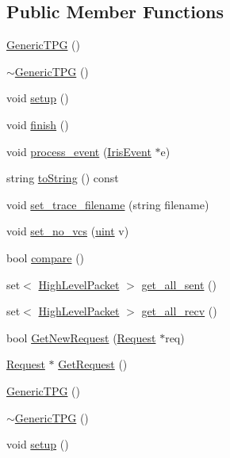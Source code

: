 \subsection*{Public Member Functions}
\begin{CompactItemize}
\item 
\hyperlink{classGenericTPG_4caf5cdc5c95a600391ecd2eb2c071fc}{GenericTPG} ()
\item 
\hyperlink{classGenericTPG_f1c645245af41d6b21eef232ff65587a}{$\sim$GenericTPG} ()
\item 
void \hyperlink{classGenericTPG_5cea355b4db26ed22a7af8e54758de47}{setup} ()
\item 
void \hyperlink{classGenericTPG_8dd8fa2cd2721789a63084d8fe912366}{finish} ()
\item 
void \hyperlink{classGenericTPG_a2e59f102384206268808835bcb9d5b5}{process\_\-event} (\hyperlink{classIrisEvent}{IrisEvent} $\ast$e)
\item 
string \hyperlink{classGenericTPG_c2e1dc7b0de824c846f37c4a1c282303}{toString} () const 
\item 
void \hyperlink{classGenericTPG_fe1f30bce868ee2caa01d3f7a2229945}{set\_\-trace\_\-filename} (string filename)
\item 
void \hyperlink{classGenericTPG_e95391a655cacb75ba23e7eb8b3cefef}{set\_\-no\_\-vcs} (\hyperlink{outputBuffer_8h_91ad9478d81a7aaf2593e8d9c3d06a14}{uint} v)
\item 
bool \hyperlink{classGenericTPG_d26b3d9a264ebe07d44b9194626c98d7}{compare} ()
\item 
set$<$ \hyperlink{classHighLevelPacket}{HighLevelPacket} $>$ \hyperlink{classGenericTPG_2b424dd4b2f5aa07a0231d69d5790470}{get\_\-all\_\-sent} ()
\item 
set$<$ \hyperlink{classHighLevelPacket}{HighLevelPacket} $>$ \hyperlink{classGenericTPG_aca7529b0e19d664ee40392b7761e338}{get\_\-all\_\-recv} ()
\item 
bool \hyperlink{classGenericTPG_e0d0461b59107eb3b4facb4d29ada948}{GetNewRequest} (\hyperlink{classRequest}{Request} $\ast$req)
\item 
\hyperlink{classRequest}{Request} $\ast$ \hyperlink{classGenericTPG_ec1a1105fdd72ac3ba86ab577c1f5226}{GetRequest} ()
\item 
\hyperlink{classGenericTPG_4caf5cdc5c95a600391ecd2eb2c071fc}{GenericTPG} ()
\item 
\hyperlink{classGenericTPG_f1c645245af41d6b21eef232ff65587a}{$\sim$GenericTPG} ()
\item 
void \hyperlink{classGenericTPG_5cea355b4db26ed22a7af8e54758de47}{setup} ()

\end{CompactItemize}

